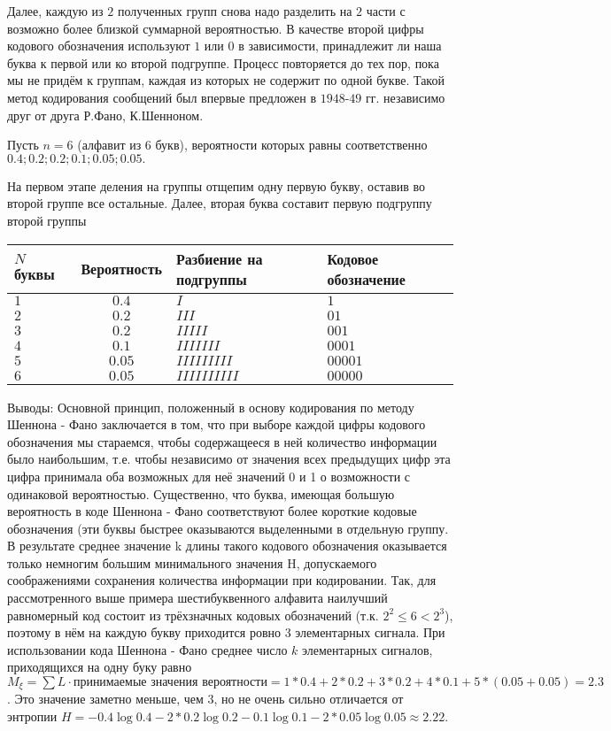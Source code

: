﻿\documentclass[a4paper,12pt]{report}
\begin{document}
	
	
	
	Далее, каждую из $2$ полученных групп снова надо разделить на $2$ части с возможно более близкой суммарной вероятностью. В качестве второй цифры кодового обозначения используют $1$ или $0$ в зависимости, принадлежит ли наша буква к первой или ко второй подгруппе. Процесс повторяется до тех пор, пока мы не придём к группам, каждая из которых не содержит по одной букве. Такой метод кодирования сообщений был впервые предложен в $1948$-$49$ гг. независимо друг от друга Р.Фано, К.Шенноном.
	
	 Пусть $n=6$ (алфавит из $6$ букв), вероятности которых равны соответственно $0.4; 0.2; 0.2; 0.1; 0.05; 0.05.$
	
	На первом этапе деления на группы отщепим одну первую букву, оставив во второй группе все остальные.
	Далее, вторая буква составит первую подгруппу второй группы	\sudots
	
	\begin{tabular}{|l|c|l|l|}
	\hline
	$N$ буквы & Вероятность & Разбиение на подгруппы & Кодовое обозначение \\
	\hline
	$1$ & $0.4$ & $I$ & $1$ \\
	\hline 
	$2$ & $0.2$ & $II$\quad$I$ & $01$ \\
	\hline 
	$3$ & $0.2$ & $II$\quad$II$\quad$I$ & $001$ \\
	\hline
	$4$ & $0.1$ & $II$\quad$II$\quad$II$\quad$I$ & $0001$ \\
	\hline
	$5$ & $0.05$& $II$\quad$II$\quad$II$\quad$II$\quad$I$ & $00001$ \\
	\hline
	$6$ & $0.05$& $II$\quad$II$\quad$II$\quad$II$\quad$II$ & $00000$ \\
	\hline
	
	\end{tabular}
	
	Выводы:  Основной принцип, положенный в основу кодирования по методу Шеннона - Фано заключается в том, что при выборе каждой цифры кодового обозначения мы стараемся, чтобы содержащееся в ней количество информации было наибольшим, т.е. чтобы независимо от значения всех предыдущих цифр эта цифра принимала оба возможных для неё значений 0 и 1 о возможности с одинаковой вероятностью. Существенно, что буква, имеющая большую вероятность в коде Шеннона - Фано соответствуют более короткие кодовые обозначения (эти буквы быстрее оказываются выделенными в отдельную группу.
	В результате среднее значение k длины такого кодового обозначения оказывается только немногим большим минимального значения H, допускаемого соображениями сохранения количества информации при кодировании.
	Так, для рассмотренного выше примера шестибуквенного алфавита наилучший равномерный код состоит из трёхзначных кодовых обозначений (т.к. $2^2 \le 6 < 2^3$), поэтому в нём на каждую букву приходится ровно 3 элементарных сигнала. При использовании кода Шеннона - Фано среднее число $k$ элементарных сигналов, приходящихся на одну буку равно $M_\xi = \sum L \cdot \mbox{принимаемые значения вероятности} = 1*0.4 + 2*0.2 + 3*0.2 + 4*0.1 +5*(0.05+0.05) = 2.3$. Это значение заметно меньше, чем 3, но не очень сильно отличается от энтропии $H = -0.4 \log 0.4 - 2*0.2 \log 0.2 - 0.1 \log 0.1 - 2*0.05 \log 0.05 \approx 2.22.$
\end{document}
